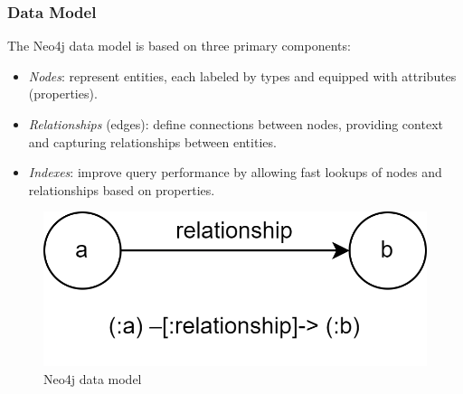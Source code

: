 \subsubsection{Data Model}
The Neo4j data model is based on three primary components:
\begin{itemize}
    \item \textit{Nodes}: represent entities, each labeled by types and equipped with attributes (properties).
    \item \textit{Relationships} (edges): define connections between nodes, providing context and capturing relationships between entities.
    \item \textit{Indexes}: improve query performance by allowing fast lookups of nodes and relationships based on properties.
\end{itemize}
\begin{figure}[H]
    \centering
    \includegraphics[width=0.50\linewidth]{images/neo4j1.png}
    \caption{Neo4j data model}
\end{figure}































































































